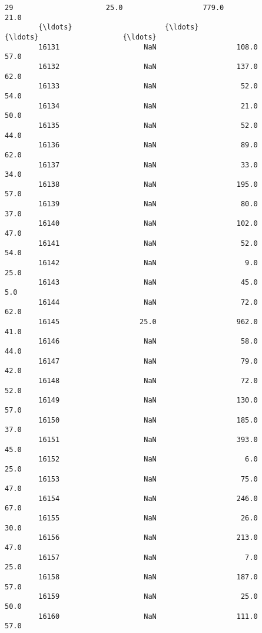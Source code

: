 \documentclass[11pt]{article}
\begin{document}
\begin{Verbatim}[commandchars=\\\{\}]
        29                      25.0                   779.0                   21.0   
        {\ldots}                      {\ldots}                     {\ldots}                    {\ldots}   
        16131                    NaN                   108.0                   57.0   
        16132                    NaN                   137.0                   62.0   
        16133                    NaN                    52.0                   54.0   
        16134                    NaN                    21.0                   50.0   
        16135                    NaN                    52.0                   44.0   
        16136                    NaN                    89.0                   62.0   
        16137                    NaN                    33.0                   34.0   
        16138                    NaN                   195.0                   57.0   
        16139                    NaN                    80.0                   37.0   
        16140                    NaN                   102.0                   47.0   
        16141                    NaN                    52.0                   54.0   
        16142                    NaN                     9.0                   25.0   
        16143                    NaN                    45.0                    5.0   
        16144                    NaN                    72.0                   62.0   
        16145                   25.0                   962.0                   41.0   
        16146                    NaN                    58.0                   44.0   
        16147                    NaN                    79.0                   42.0   
        16148                    NaN                    72.0                   52.0   
        16149                    NaN                   130.0                   57.0   
        16150                    NaN                   185.0                   37.0   
        16151                    NaN                   393.0                   45.0   
        16152                    NaN                     6.0                   25.0   
        16153                    NaN                    75.0                   47.0   
        16154                    NaN                   246.0                   67.0   
        16155                    NaN                    26.0                   30.0   
        16156                    NaN                   213.0                   47.0   
        16157                    NaN                     7.0                   25.0   
        16158                    NaN                   187.0                   57.0   
        16159                    NaN                    25.0                   50.0   
        16160                    NaN                   111.0                   57.0   
        

\end{Verbatim}
\end{document}
